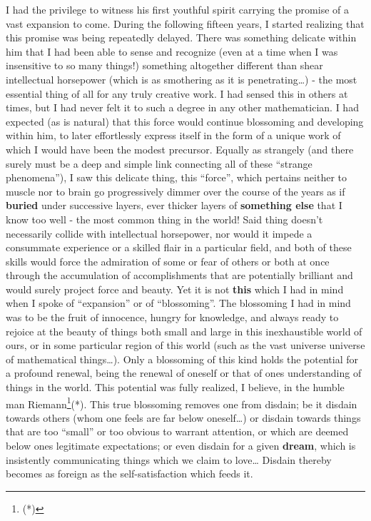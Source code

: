 I had the privilege to witness his first youthful spirit carrying the promise of a vast
expansion to come. During the following fifteen years, I started realizing that this
promise was being repeatedly delayed. There was something delicate within him that I had
been able to sense and recognize (even at a time when I was insensitive to so many things!)
something altogether different than shear intellectual horsepower (which is as smothering
as it is penetrating\ldots) - the most essential thing of all for any truly creative work. 
I had sensed this in others at times, but I had never felt it to such a degree in any
other mathematician. I had expected (as is natural) that this force would continue
blossoming and developing within him, to later effortlessly express itself in the form of
a unique work of which I would have been the modest precursor.
Equally as strangely (and there surely must be a deep and simple link connecting all of
these ``strange phenomena''), I saw this delicate thing, this ``force'', which pertains
neither to muscle nor to brain go progressively dimmer over the course of the years as if
\textbf{buried} under successive layers, ever thicker layers of \textbf{something else}
that I know too well - 
the most common thing in the world! 
Said thing doesn't necessarily collide with intellectual horsepower, nor would it impede a
consummate experience or a skilled flair in a particular field, and both of these skills
would force the admiration of some or fear of others or both at once
through the accumulation of accomplishments that are potentially brilliant and would
surely project force and beauty. Yet it is not \textbf{this} which I had in mind when I
spoke of ``expansion'' or of ``blossoming''. 
The  blossoming I had in mind was to be the
fruit of innocence, hungry for knowledge, and always ready to rejoice at the beauty of
things both small and large in this inexhaustible world of ours, or in some particular
region of this world (such as the vast universe universe of mathematical things\ldots).
Only a blossoming of this kind holds the potential for a profound renewal, being the
renewal of oneself or that of ones understanding of things in the world. This potential
was fully realized, I believe, in the humble man Riemann\footnote{(*)}(*).
This true blossoming removes one from disdain; be it disdain towards
others (whom one feels are far below oneself\ldots) or disdain towards things that are too
``small'' or too obvious to warrant attention, or which are deemed below ones legitimate
expectations; or even disdain for a given \textbf{dream}, which is insistently
communicating things which we claim to love\ldots
Disdain thereby becomes as foreign as the self-satisfaction which feeds it.

